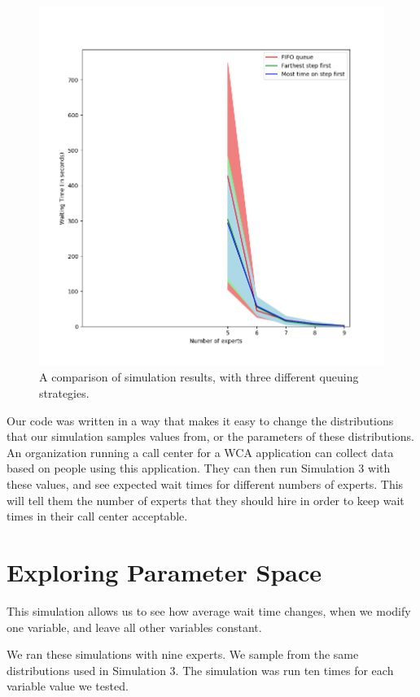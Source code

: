 \begin{figure}[H]
  \includegraphics[width=\textwidth]{figures/montecarlo/full_three_strategies.png}
  \caption{
    A comparison of simulation results, with three different queuing strategies.
  }\label{fig:full_three_strategies}
\end{figure}

Our code was written in a way that makes it easy to change the distributions
that our simulation samples values from, or the parameters of these
distributions.
An organization running a call center for a WCA application can collect data
based on people using this application.
They can then run Simulation 3 with these values, and see expected wait times
for different numbers of experts.
This will tell them the number of experts that they should hire in order to keep
wait times in their call center acceptable.

\section{Exploring Parameter Space}

This simulation allows us to see how average wait time changes, when we modify
one variable, and leave all other variables constant.

We ran these simulations with nine experts.
We sample from the same distributions used in Simulation 3.
The simulation was run ten times for each variable value we tested.

